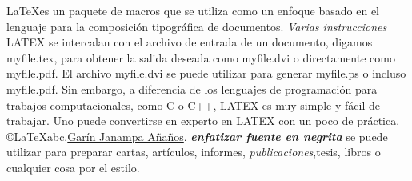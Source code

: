 \documentclass{article}
\begin{document}
\LaTeX es un paquete de macros que se utiliza como un enfoque basado en el 
lenguaje para la composición tipográfica de documentos. \textit{Varias instrucciones}
LATEX se intercalan con el archivo de entrada de un documento, digamos 
myfile.tex, para obtener la salida deseada como myfile.dvi o directamente 
como myfile.pdf. El archivo myfile.dvi se puede utilizar para generar 
myfile.ps o incluso myfile.pdf. Sin embargo, a diferencia de los 
lenguajes de programación para trabajos computacionales, como 
C o C++, LATEX es muy simple y fácil de trabajar. Uno puede 
convertirse en experto en LATEX con un poco de práctica.
\copyright \LaTeX abc.\underline {Gar\'{i}n Janampa A\~na\~nos}.
\emph{\textbf{enfatizar fuente en negrita}}
se puede utilizar para preparar {\huge cartas}, artículos, 
informes, {\large{\it publicaciones}},{\LARGE tesis}, libros o cualquier cosa por el {\Huge estilo}.
\end{document}
